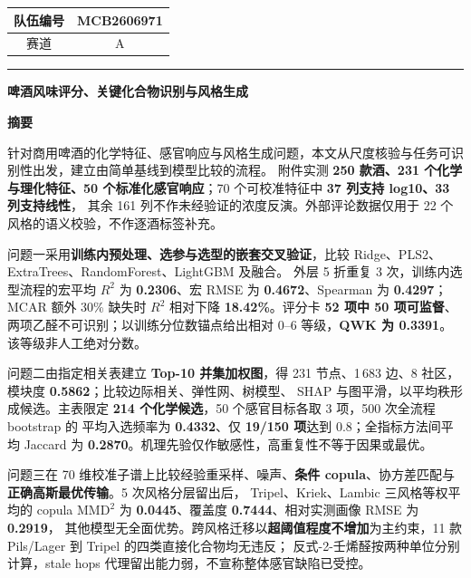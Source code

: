\documentclass[UTF8,a4paper,zihao=-4]{ctexart}
\numberwithin{figure}{section}
\numberwithin{table}{section}
\numberwithin{equation}{section}
\begin{document}
\thispagestyle{empty}
\begin{center}
\begin{tabular}{|c|c|}
\hline
队伍编号 & MCB2606971 \\
\hline
赛道 & A \\
\hline
\end{tabular}
\end{center}
\vspace{0.8em}
\hrule
\vspace{0.8em}
\begin{center}
{\bfseries 啤酒风味评分、关键化合物识别与风格生成}
\end{center}
\vspace{0.2em}
\begin{center}
\textbf{ 摘\quad 要}
\end{center}

针对商用啤酒的化学特征、感官响应与风格生成问题，本文从尺度核验与任务可识别性出发，建立由简单基线到模型比较的流程。
附件实测 \textbf{250 款酒、231 个化学与理化特征、50 个标准化感官响应}；70 个可校准特征中 \textbf{37 列支持 log10、33 列支持线性}，
其余 161 列不作未经验证的浓度反演。外部评论数据仅用于 22 个风格的语义校验，不作逐酒标签补充。

问题一采用\textbf{训练内预处理、选参与选型的嵌套交叉验证}，比较 Ridge、PLS2、ExtraTrees、RandomForest、LightGBM 及融合。
外层 5 折重复 3 次，训练内选型流程的宏平均 $R^2$ 为 \textbf{0.2306}、宏 RMSE 为 \textbf{0.4672}、Spearman 为 \textbf{0.4297}；MCAR 额外 30\% 缺失时 
$R^2$ 相对下降 \textbf{18.42\%}。评分卡 \textbf{52 项中 50 项可监督}、两项乙醛不可识别；以训练分位数锚点给出相对 0--6 等级，\textbf{QWK 为 0.3391}。
该等级非人工绝对分数。

问题二由指定相关表建立 \textbf{Top-10 并集加权图}，得 231 节点、1\,683 边、8 社区，模块度 \textbf{0.5862}；比较边际相关、弹性网、树模型、
SHAP 与图平滑，以平均秩形成候选。主表限定 \textbf{214 个化学候选}，50 个感官目标各取 3 项，500 次全流程 bootstrap 的
平均入选频率为 \textbf{0.4332}、仅 \textbf{19/150 项}达到 0.8；全指标方法间平均 Jaccard 为 \textbf{0.2870}。机理先验仅作敏感性，高重复性不等于因果或最优。

问题三在 70 维校准子谱上比较经验重采样、噪声、\textbf{条件 copula}、协方差匹配与\textbf{正确高斯最优传输}。5 次风格分层留出后，
Tripel、Kriek、Lambic 三风格等权平均的 copula $\mathrm{MMD}^2$ 为 \textbf{0.0445}、覆盖度 \textbf{0.7444}、相对实测画像 RMSE 为 \textbf{0.2919}，
其他模型无全面优势。跨风格迁移以\textbf{超阈值程度不增加}为主约束，11 款 Pils/Lager 到 Tripel 的四类直接化合物均无违反；
反式-2-壬烯醛按两种单位分别计算，stale hops 代理留出能力弱，不宣称整体感官缺陷已受控。
\end{document}
